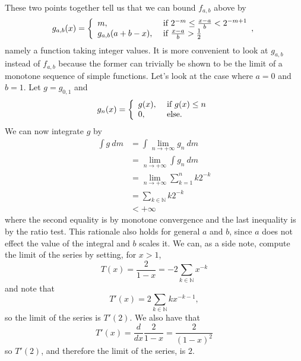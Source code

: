 \documentclass[a4paper,12pt,twoside,BCOR=10mm]{scrbook}
\theoremstyle{definition}
\theoremstyle{definition}
\theoremstyle{definition}
\begin{document}
These two points together tell us that we can bound $f_{a, b}$ above by
\[
\label{index31}
	g_{a, b}(x) =
	\left \{
	\begin{array}{l l}
	m, & \text{ if } 2^{-m} \leq \frac{x - a}{b} < 2^{-m + 1}\\
	g_{a, b}(a + b - x) , & \text{ if } \frac{x - a}{b} > \frac{1}{2}
	\end{array},
	\right .
\]
namely a function taking integer values.
It is more convenient to look at $g_{a, b}$ instead of $f_{a, b}$ because the former can trivially be shown to be the limit of a monotone sequence of simple functions.
Let's look at the case where $a = 0$ and $b = 1$.
Let $g = g_{0, 1}$ and
\[
	g_n(x) = \left \{
	\begin{array}{l l}
	g(x), & \text{ if } g(x) \leq n \\
	0, & \text{ else}.
	\end{array}
	\right .
\]
We can now integrate $g$ by
\begin{align*}
	\int g\ dm
	&= \int \lim_{n \rightarrow +\infty} g_n\ dm\\
	&= \lim_{n \rightarrow +\infty} \int g_n\ dm\\
	&= \lim_{n \rightarrow +\infty} \sum_{k = 1}^n k2^{-k}\\
	&= \sum_{k \in \mathbb{N}} k2^{-k}\\
	&< +\infty
\end{align*}
where the second equality is by monotone convergence and the last inequality is by the ratio test.
This rationale also holds for general $a$ and $b$, since $a$ does not effect the value of the integral and $b$ scales it.
We can, as a side note, compute the limit of the series by setting, for $x > 1$,
\[
	T(x) = \frac{2}{1 - x} = -2\sum_{k \in \mathbb{N}} x^{-k}
\]
and note that
\[
	T'(x) = 2\sum_{k \in \mathbb{N}} kx^{-k - 1},
\]
so the limit of the series is $T'(2)$.
We also have that
\[
	T'(x) = \frac{d}{dx}\frac{2}{1 - x} = \frac{2}{(1 - x)^2}
\]
so $T'(2)$, and therefore the limit of the series, is $2$.
\end{document}
